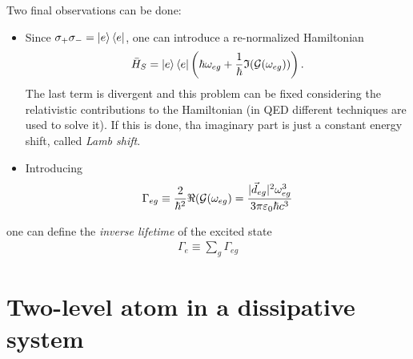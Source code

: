 \noindent Two final observations can be done: 
\begin{itemize}
    \item Since $\sigma_+ \sigma_- = \ket{e}\bra{e}$, one can introduce a re-normalized Hamiltonian 
\begin{align*}
    \bar{H}_S = \ket{e}\bra{e} \left( \hbar \omega_{eg} + \frac{1}{\hbar} \mathfrak{I}(\mathcal{G}(\omega_{eg})) \right). 
\end{align*}
The last term is divergent and this problem can be fixed considering the relativistic contributions to the Hamiltonian (in QED different techniques are used to solve it). If this is done, tha imaginary part is just a constant energy shift, called \textit{Lamb shift}. 
\item Introducing 
\begin{equation}
    \Gamma_{eg} \equiv \frac{2}{\hbar^2} \real (\mathcal{G}(\omega_{eg}) =  \frac{|\vec{d}_{eg}|^2 \omega^3_{eg}}{3 \pi \varepsilon_0 \hbar c^3}
\end{equation}
\end{itemize}
one can define the \textit{inverse lifetime} of the excited state 
\begin{align}
    \Gamma_e \equiv{\sum_g} \Gamma_{eg} 
\end{align}













\section{Two-level atom in a dissipative system}

